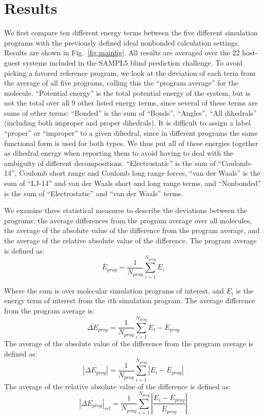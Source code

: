 \section*{Results}
We first compare ten different energy terms between the five different
simulation programs with the previously defined ideal nonbonded calculation settings.  Results are
shown in Fig.~\ref{fig:mainfig}. All results are averaged over the 22
host-guest systems included in the SAMPL5 blind prediction
challenge. To avoid picking a favored reference program, we look at
the deviation of each term from the average of all five programs,
calling this the ``program average'' for the molecule.  ``Potential
energy'' is the total potential energy of the system, but is not the
total over all 9 other listed energy terms, since several of these terms 
are sums of other terms: ``Bonded'' is the sum of ``Bonds'', ``Angles'',
``All dihedrals'' (including both improper and proper dihedrals). 
It is difficult to assign a label ``proper'' or ``improper'' to a
given dihedral, since in different programs the same functional form
is used for both types. We thus put all of these energies together as
dihedral energy when reporting them to avoid having to deal with the
ambiguity of different decompositions.
``Electrostatic'' is the sum of ``Coulomb-14'', Coulomb short range
and Coulomb long range forces, ``van der Waals'' is the sum of
``LJ-14'' and van der Waals short and long range terms, and
``Nonbonded'' is the sum of ``Electrostatic'' and ``van der Waals''
terms.

We examine three statistical measures to describe the deviations
between the programs: the average differences from the program average
over all molecules, the average of the absolute value of the
difference from the program average, and the average of the relative absolute value of the difference. 
The program average is defined as: 
\[  \overline{E}_{prog} = \frac{1}{N_{prog}}\sum_{i=1}^{N_{prog}} E_i \]

Where the sum is over molecular simulation programs of interest, and $E_i$ is the energy term of interest from the $i$th simulation program.  The average difference from the program average is: 
\[  \overline{\Delta E}_{prog} = \frac{1}{N_{prog}}\sum_{i=1}^{N_{prog}} E_i - \overline{E}_{prog} \]
The average of the absolute value of the difference from the program average is defined as:
\[  \overline{\left|\Delta E_{prog}\right|} = \frac{1}{N_{prog}}\sum_{i=1}^{N_{prog}} \left|E_i - \overline{E}_{prog}\right| \]
The average of the relative absolute value of the difference is defined as:
\[  \overline{\left|\Delta E_{prog}\right|}_{rel} = \frac{1}{N_{prog}}\sum_{i=1}^{N_{prog}} \left|\frac{E_i - \overline{E}_{prog}}{\overline{E}_{prog}}\right| \]

